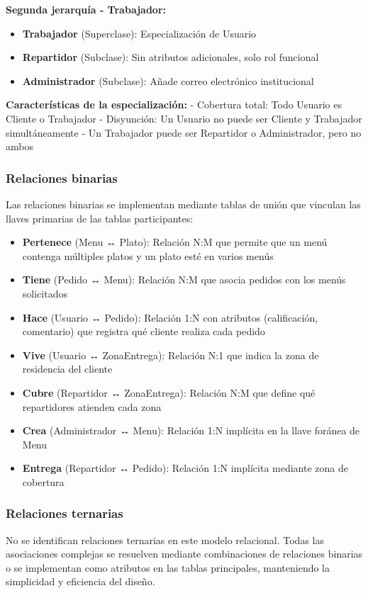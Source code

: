\documentclass[12pt,a4paper]{article}
\begin{document}
\textbf{Segunda jerarquía - Trabajador:}
\begin{itemize}
    \item \textbf{Trabajador} (Superclase): Especialización de Usuario
    \item \textbf{Repartidor} (Subclase): Sin atributos adicionales, solo rol funcional
    \item \textbf{Administrador} (Subclase): Añade correo electrónico institucional
\end{itemize}

\textbf{Características de la especialización:}
- Cobertura total: Todo Usuario es Cliente o Trabajador
- Disyunción: Un Usuario no puede ser Cliente y Trabajador simultáneamente
- Un Trabajador puede ser Repartidor o Administrador, pero no ambos

\subsubsection{Relaciones binarias}
Las relaciones binarias se implementan mediante tablas de unión que vinculan las llaves primarias de las tablas participantes:

\begin{itemize}
    \item \textbf{Pertenece} (Menu ↔ Plato): Relación N:M que permite que un menú contenga múltiples platos y un plato esté en varios menús
    \item \textbf{Tiene} (Pedido ↔ Menu): Relación N:M que asocia pedidos con los menús solicitados
    \item \textbf{Hace} (Usuario ↔ Pedido): Relación 1:N con atributos (calificación, comentario) que registra qué cliente realiza cada pedido
    \item \textbf{Vive} (Usuario ↔ ZonaEntrega): Relación N:1 que indica la zona de residencia del cliente
    \item \textbf{Cubre} (Repartidor ↔ ZonaEntrega): Relación N:M que define qué repartidores atienden cada zona
    \item \textbf{Crea} (Administrador ↔ Menu): Relación 1:N implícita en la llave foránea de Menu
    \item \textbf{Entrega} (Repartidor ↔ Pedido): Relación 1:N implícita mediante zona de cobertura
\end{itemize}

\subsubsection{Relaciones ternarias}
No se identifican relaciones ternarias en este modelo relacional. Todas las asociaciones complejas se resuelven mediante combinaciones de relaciones binarias o se implementan como atributos en las tablas principales, manteniendo la simplicidad y eficiencia del diseño.
\end{document}
